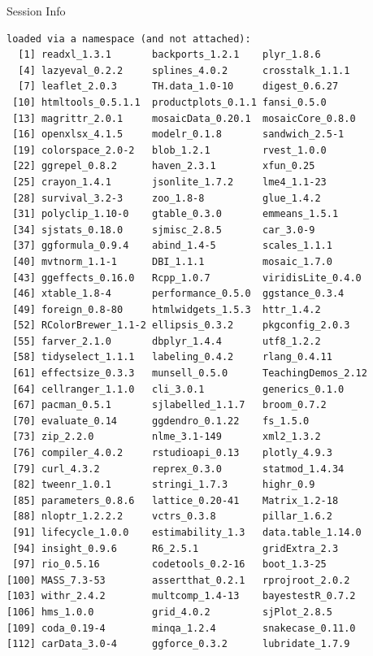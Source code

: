 \documentclass[10pt,handout]{beamer}\usepackage[]{graphicx}\usepackage[]{color}
\makeatletter
\newenvironment{kframe}{%
 \def\at@end@of@kframe{}%
 \ifinner\ifhmode%
  \def\at@end@of@kframe{\end{minipage}}%
  \begin{minipage}{\columnwidth}%
 \fi\fi%
 \def\FrameCommand##1{\hskip\@totalleftmargin \hskip-\fboxsep
 \colorbox{shadecolor}{##1}\hskip-\fboxsep
     \hskip-\linewidth \hskip-\@totalleftmargin \hskip\columnwidth}%
 \MakeFramed {\advance\hsize-\width
   \@totalleftmargin\z@ \linewidth\hsize
   \@setminipage}}%
 {\par\unskip\endMakeFramed%
 \at@end@of@kframe}
\newenvironment{knitrout}{}{} %
\makeatother
\begin{document}
\begin{frame}[fragile]{Session Info}
\begin{knitrout}
\begin{kframe}
\begin{verbatim}
loaded via a namespace (and not attached):
  [1] readxl_1.3.1       backports_1.2.1    plyr_1.8.6        
  [4] lazyeval_0.2.2     splines_4.0.2      crosstalk_1.1.1   
  [7] leaflet_2.0.3      TH.data_1.0-10     digest_0.6.27     
 [10] htmltools_0.5.1.1  productplots_0.1.1 fansi_0.5.0       
 [13] magrittr_2.0.1     mosaicData_0.20.1  mosaicCore_0.8.0  
 [16] openxlsx_4.1.5     modelr_0.1.8       sandwich_2.5-1    
 [19] colorspace_2.0-2   blob_1.2.1         rvest_1.0.0       
 [22] ggrepel_0.8.2      haven_2.3.1        xfun_0.25         
 [25] crayon_1.4.1       jsonlite_1.7.2     lme4_1.1-23       
 [28] survival_3.2-3     zoo_1.8-8          glue_1.4.2        
 [31] polyclip_1.10-0    gtable_0.3.0       emmeans_1.5.1     
 [34] sjstats_0.18.0     sjmisc_2.8.5       car_3.0-9         
 [37] ggformula_0.9.4    abind_1.4-5        scales_1.1.1      
 [40] mvtnorm_1.1-1      DBI_1.1.1          mosaic_1.7.0      
 [43] ggeffects_0.16.0   Rcpp_1.0.7         viridisLite_0.4.0 
 [46] xtable_1.8-4       performance_0.5.0  ggstance_0.3.4    
 [49] foreign_0.8-80     htmlwidgets_1.5.3  httr_1.4.2        
 [52] RColorBrewer_1.1-2 ellipsis_0.3.2     pkgconfig_2.0.3   
 [55] farver_2.1.0       dbplyr_1.4.4       utf8_1.2.2        
 [58] tidyselect_1.1.1   labeling_0.4.2     rlang_0.4.11      
 [61] effectsize_0.3.3   munsell_0.5.0      TeachingDemos_2.12
 [64] cellranger_1.1.0   cli_3.0.1          generics_0.1.0    
 [67] pacman_0.5.1       sjlabelled_1.1.7   broom_0.7.2       
 [70] evaluate_0.14      ggdendro_0.1.22    fs_1.5.0          
 [73] zip_2.2.0          nlme_3.1-149       xml2_1.3.2        
 [76] compiler_4.0.2     rstudioapi_0.13    plotly_4.9.3      
 [79] curl_4.3.2         reprex_0.3.0       statmod_1.4.34    
 [82] tweenr_1.0.1       stringi_1.7.3      highr_0.9         
 [85] parameters_0.8.6   lattice_0.20-41    Matrix_1.2-18     
 [88] nloptr_1.2.2.2     vctrs_0.3.8        pillar_1.6.2      
 [91] lifecycle_1.0.0    estimability_1.3   data.table_1.14.0 
 [94] insight_0.9.6      R6_2.5.1           gridExtra_2.3     
 [97] rio_0.5.16         codetools_0.2-16   boot_1.3-25       
[100] MASS_7.3-53        assertthat_0.2.1   rprojroot_2.0.2   
[103] withr_2.4.2        multcomp_1.4-13    bayestestR_0.7.2  
[106] hms_1.0.0          grid_4.0.2         sjPlot_2.8.5      
[109] coda_0.19-4        minqa_1.2.4        snakecase_0.11.0  
[112] carData_3.0-4      ggforce_0.3.2      lubridate_1.7.9   
\end{verbatim}
\end{kframe}
\end{knitrout}
	
\end{frame}
\end{document}
